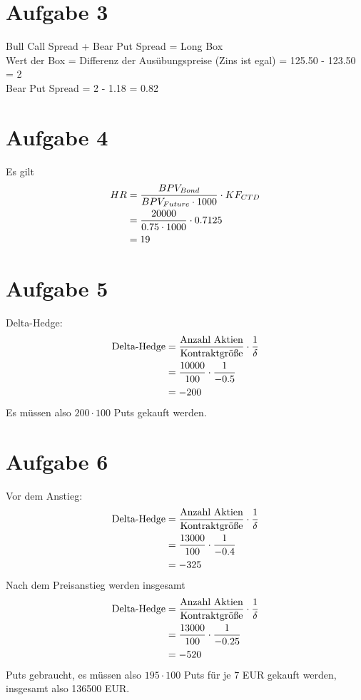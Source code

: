 \documentclass{article}
\begin{document}
	\section*{Aufgabe 3}
	Bull Call Spread + Bear Put Spread = Long Box \\
	Wert der Box = Differenz der Ausübungspreise (Zins ist egal) = 125.50 - 123.50 = 2 \\
	Bear Put Spread = 2 - 1.18 = 0.82
	
	\section*{Aufgabe 4}
	Es gilt
	\begin{align}
		HR &= \frac{BPV_{Bond}}{BPV_{Future}\cdot 1000}\cdot KF_{CTD} \notag \\
		&= \frac{20000}{0.75\cdot 1000}\cdot 0.7125 \notag \\
		&= 19 \notag
	\end{align}
	
	\section*{Aufgabe 5}
	Delta-Hedge:
	\begin{align}
		\text{Delta-Hedge} &= \frac{\text{Anzahl Aktien}}{\text{Kontraktgröße}}\cdot\frac{1}{\delta} \notag \\
		&= \frac{10000}{100} \cdot \frac{1}{-0.5} \notag \\
		&= -200 \notag
	\end{align}
	Es müssen also $200\cdot 100$ Puts gekauft werden.
	
	\section*{Aufgabe 6}
	Vor dem Anstieg:
	\begin{align}
		\text{Delta-Hedge} &= \frac{\text{Anzahl Aktien}}{\text{Kontraktgröße}}\cdot\frac{1}{\delta} \notag \\
		&= \frac{13000}{100} \cdot \frac{1}{-0.4} \notag \\
		&= -325 \notag
	\end{align}
	Nach dem Preisanstieg werden insgesamt
	\begin{align}
		\text{Delta-Hedge} &= \frac{\text{Anzahl Aktien}}{\text{Kontraktgröße}}\cdot\frac{1}{\delta} \notag \\
		&= \frac{13000}{100} \cdot \frac{1}{-0.25} \notag \\
		&= -520 \notag
	\end{align}
	Puts gebraucht, es müssen also $195\cdot 100$ Puts für je 7 EUR gekauft werden, insgesamt also 136500 EUR.
	
\end{document}

